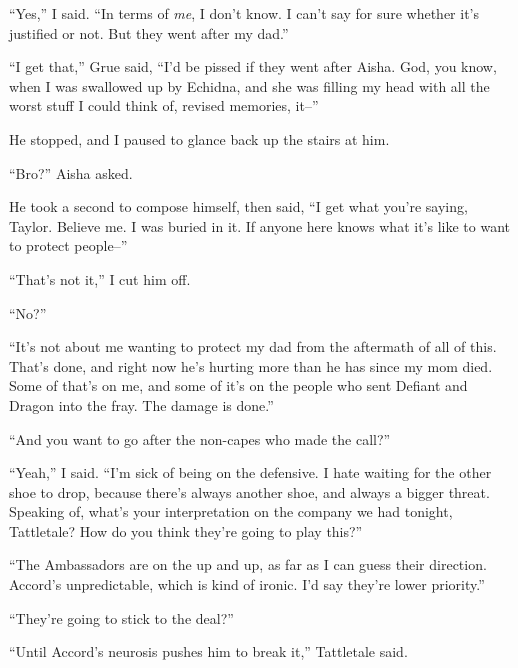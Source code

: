 ``Yes,'' I said.  ``In terms of \emph{me}, I don't know.  I can't say for sure whether it's justified or not.  But they went after my dad.''



``I get that,'' Grue said, ``I'd be pissed if they went after Aisha.  God, you know, when I was swallowed up by Echidna, and she was filling my head with all the worst stuff I could think of, revised memories, it--''



He stopped, and I paused to glance back up the stairs at him.



``Bro?'' Aisha asked.



He took a second to compose himself, then said, ``I get what you're saying, Taylor.  Believe me.  I was buried in it.  If anyone here knows what it's like to want to protect people--''



``That's not it,'' I cut him off.



``No?''



``It's not about me wanting to protect my dad from the aftermath of all of this.  That's done, and right now he's hurting more than he has since my mom died.  Some of that's on me, and some of it's on the people who sent Defiant and Dragon into the fray.  The damage is done.''



``And you want to go after the non-capes who made the call?''



``Yeah,'' I said.  ``I'm sick of being on the defensive.  I hate waiting for the other shoe to drop, because there's always another shoe, and always a bigger threat.  Speaking of, what's your interpretation on the company we had tonight, Tattletale?  How do you think they're going to play this?''



``The Ambassadors are on the up and up, as far as I can guess their direction.  Accord's unpredictable, which is kind of ironic.  I'd say they're lower priority.''



``They're going to stick to the deal?''



``Until Accord's neurosis pushes him to break it,'' Tattletale said.



